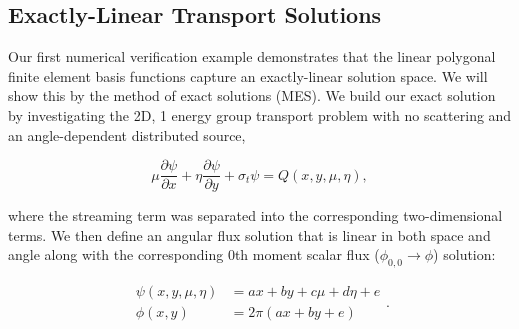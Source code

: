 \documentclass[preprint,10pt]{elsarticle}
\begin{document}
\subsection{Exactly-Linear Transport Solutions}

Our first numerical verification example demonstrates that the linear polygonal finite element basis functions capture an exactly-linear solution space. We will show this by the method of exact solutions (MES). We build our exact solution by investigating the 2D, 1 energy group transport problem with no scattering and an angle-dependent distributed source,

\begin{equation}
\label{eq::Results_Linear_angflux}
\mu \frac{\partial \psi}{\partial x} + \eta \frac{\partial \psi}{\partial y} + \sigma_t \psi = Q(x,y, \mu, \eta), 
\end{equation}

\noindent where the streaming term was separated into the corresponding two-dimensional terms. We then define an angular flux solution that is linear in both space and angle along with the corresponding 0th moment scalar flux ($\phi_{0,0} \rightarrow \phi$) solution:

\begin{equation}
\label{eq::BF_Results_Linear_fluxsols}
\begin{aligned}
\psi (x,y,\mu,\eta) &= ax + by + c \mu + d\eta + e\\
\phi (x,y) &= 2 \pi \left( ax + by  + e \right)
\end{aligned} .
\end{equation}
\end{document}
